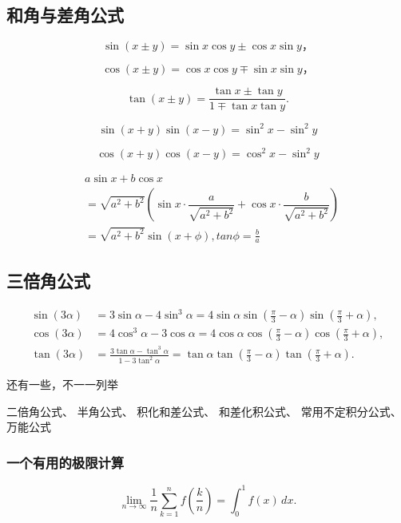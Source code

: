 \documentclass{article}
\numberwithin{equation}{section}
\begin{document}
\subsection{和角与差角公式}
\[
\sin(x \pm y) = \sin x \cos y \pm \cos x \sin y，
\]

\[
\cos(x \pm y) = \cos x \cos y \mp \sin x \sin y，
\]

\[
\tan(x \pm y) = \frac{\tan x \pm \tan y}{1 \mp \tan x \tan y}.
\]


\[
\sin(x+y)\sin(x-y) = \sin^2 x - \sin^2 y
\]

\[
\cos(x+y)\cos(x-y) = \cos^2 x - \sin^2 y
\]



\begin{align}
& a \sin x + b \cos x \\
&= \sqrt{a^2 + b^2}\left( \sin x \cdot \dfrac{a}{\sqrt{ a^2 + b^2}} + \cos x \cdot \dfrac{b}{\sqrt{ a^2 + b^2}} \right) \\
&= \sqrt{a^2 + b^2} \sin (x + \phi), tan \phi = \frac{b}{a}
\end{align}

\subsection{三倍角公式}
\begin{align}
    \sin(3\alpha) &= 3\sin\alpha - 4\sin^3\alpha = 4\sin\alpha \sin\left(\frac{\pi}{3} - \alpha\right)\sin\left(\frac{\pi}{3} + \alpha\right), \\
    \cos(3\alpha) &= 4\cos^3\alpha - 3\cos\alpha = 4\cos\alpha \cos\left(\frac{\pi}{3} - \alpha\right)\cos\left(\frac{\pi}{3} + \alpha\right), \\
    \tan(3\alpha) &= \frac{3\tan\alpha - \tan^3\alpha}{1 - 3\tan^2\alpha} = \tan\alpha  \tan\left(\frac{\pi}{3} - \alpha\right)\tan \left(\frac{\pi}{3} + \alpha\right).
\end{align}


还有一些，不一一列举

二倍角公式、
半角公式、
积化和差公式、
和差化积公式、
常用不定积分公式、
万能公式



\subsubsection{一个有用的极限计算}

\[
\lim_{n \to \infty} \frac{1}{n} \sum_{k=1}^n f\left(\frac{k}{n}\right) = \int_0^1 f(x) \, dx.
\]
\end{document}
